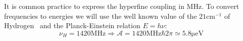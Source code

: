 It is common practice to express the hyperfine coupling in $\si{\MHz}$. To convert frequencies to energies we will use the well known value of the $21\si{\cm^{-1}}$ of Hydrogen~\cite{Hellwig1970} and the Planck-Einstein relation $E=h\nu$:
\begin{equation}
  \nu_H = 1420\si{\MHz} \Rightarrow \mathcal{A} = 1420\si{\MHz}\hbar2\pi\simeq
  5.8 \si{\micro\eV}
\end{equation}
